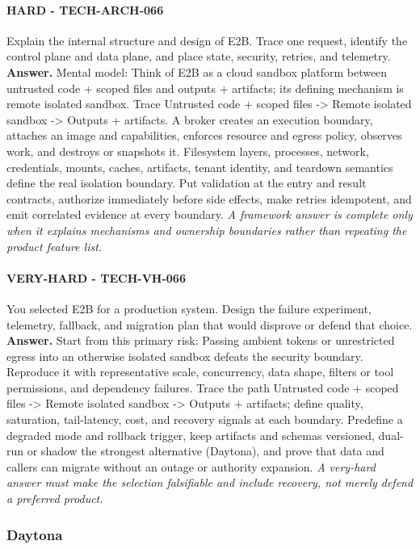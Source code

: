 \paragraph{HARD - TECH-ARCH-066} Explain the internal structure and design of E2B. Trace one request, identify the control plane and data plane, and place state, security, retries, and telemetry.
\textbf{Answer.} Mental model: Think of E2B as a cloud sandbox platform between untrusted code + scoped files and outputs + artifacts; its defining mechanism is remote isolated sandbox. Trace Untrusted code + scoped files -> Remote isolated sandbox -> Outputs + artifacts. A broker creates an execution boundary, attaches an image and capabilities, enforces resource and egress policy, observes work, and destroys or snapshots it. Filesystem layers, processes, network, credentials, mounts, caches, artifacts, tenant identity, and teardown semantics define the real isolation boundary. Put validation at the entry and result contracts, authorize immediately before side effects, make retries idempotent, and emit correlated evidence at every boundary.
\textit{A framework answer is complete only when it explains mechanisms and ownership boundaries rather than repeating the product feature list.}
\paragraph{VERY-HARD - TECH-VH-066} You selected E2B for a production system. Design the failure experiment, telemetry, fallback, and migration plan that would disprove or defend that choice.
\textbf{Answer.} Start from this primary risk: Passing ambient tokens or unrestricted egress into an otherwise isolated sandbox defeats the security boundary. Reproduce it with representative scale, concurrency, data shape, filters or tool permissions, and dependency failures. Trace the path Untrusted code + scoped files -> Remote isolated sandbox -> Outputs + artifacts; define quality, saturation, tail-latency, cost, and recovery signals at each boundary. Predefine a degraded mode and rollback trigger, keep artifacts and schemas versioned, dual-run or shadow the strongest alternative (Daytona), and prove that data and callers can migrate without an outage or authority expansion.
\textit{A very-hard answer must make the selection falsifiable and include recovery, not merely defend a preferred product.}
\subsubsection*{Daytona}
